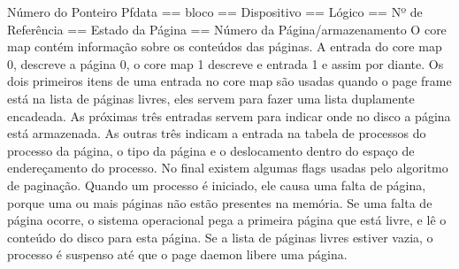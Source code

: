 Número do Ponteiro Pfdata == bloco == Dispositivo == Lógico == Nº de Referência == Estado da Página == Número da Página/armazenamento
O core map contém informação sobre os conteúdos das páginas. A entrada do core map 0, descreve a página 0, o core map 1 descreve e entrada 1 e assim por diante. Os dois primeiros itens de uma entrada no core map são usadas quando o page frame está na lista de páginas livres, eles servem para fazer uma lista duplamente encadeada. As próximas três entradas servem para indicar onde no disco a página está armazenada. As outras três indicam a entrada na tabela de processos do processo da página, o tipo da página e o deslocamento dentro do espaço de endereçamento do processo. No final existem algumas flags usadas pelo algoritmo de paginação.
Quando um processo é iniciado, ele causa uma falta de página, porque uma ou mais páginas não estão presentes na memória. Se uma falta de página ocorre, o sistema operacional pega a primeira página que está livre, e lê o conteúdo do disco para esta página. Se a lista de páginas livres estiver vazia, o processo é suspenso até que o page daemon libere uma página.
